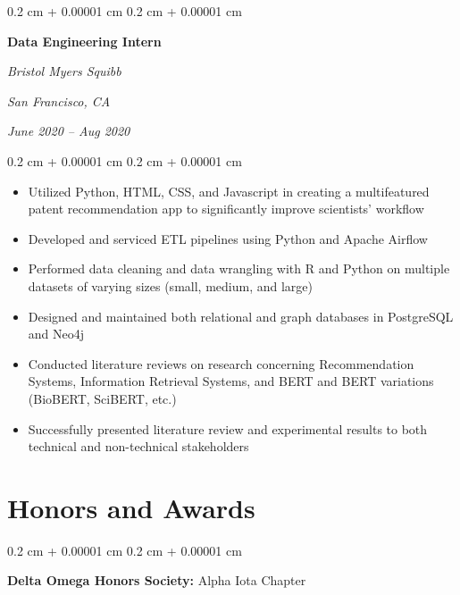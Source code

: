 \documentclass[10pt, letterpaper]{article}
\newenvironment{highlights}{
    \begin{itemize}[
        topsep=0.10 cm,
        parsep=0.10 cm,
        partopsep=0pt,
        itemsep=0pt,
        leftmargin=0.4 cm + 10pt
    ]
}{
    \end{itemize}
} %
\newenvironment{onecolentry}{
    \begin{adjustwidth}{
        0.2 cm + 0.00001 cm
    }{
        0.2 cm + 0.00001 cm
    }
}{
    \end{adjustwidth}
} %
\newenvironment{twocolentry}[2][]{
    \onecolentry
    \def\secondColumn{#2}
    \setcolumnwidth{\fill, 4.5 cm}
    \begin{paracol}{2}
}{
    \switchcolumn \raggedleft \secondColumn
    \end{paracol}
    \endonecolentry
} %
\begin{document}
        \vspace{0.2 cm}

        \begin{twocolentry}{
        \textit{San Francisco, CA}    
            
        \textit{June 2020 – Aug 2020}}
            \textbf{Data Engineering Intern}
            
            \textit{Bristol Myers Squibb}
        \end{twocolentry}

        \vspace{0.10 cm}
        \begin{onecolentry}
            \begin{highlights}
                \item Utilized Python, HTML, CSS, and Javascript in creating a multifeatured patent recommendation app to significantly improve scientists' workflow
                \item Developed and serviced ETL pipelines using Python and Apache Airflow
                \item Performed data cleaning and data wrangling with R and Python on multiple datasets of varying sizes (small, medium, and large)
                \item Designed and maintained both relational and graph databases in PostgreSQL and Neo4j
                \item Conducted literature reviews on research concerning Recommendation Systems, Information Retrieval Systems, and BERT and BERT variations (BioBERT, SciBERT, etc.)
                \item Successfully presented literature review and experimental results to both technical and non-technical stakeholders
            \end{highlights}
        \end{onecolentry}



    
    \section{Honors and Awards}



        
        \begin{onecolentry}
            \textbf{Delta Omega Honors Society:} Alpha Iota Chapter
        \end{onecolentry}

        \vspace{0.2 cm}
\end{document}
